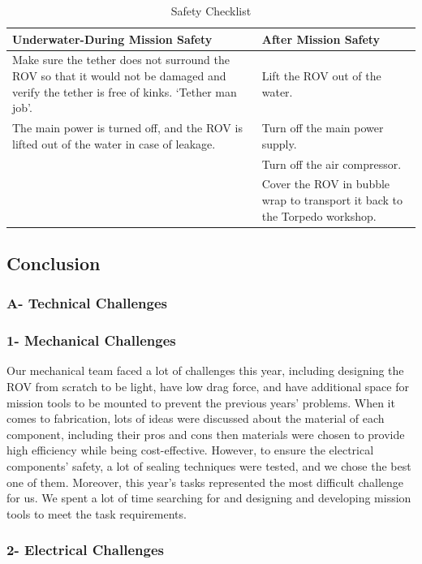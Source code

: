 \documentclass[a4paper,12pt,leqno]{report}
\begin{document}
\begin{table}[H]
	\centering
	\caption{Safety Checklist}
	\begin{tabular}{|p{8cm}|p{8cm}|}
	\hline
\textcolor{red!80}{Underwater-During Mission Safety}&\textcolor{red!80}{After Mission Safety}\\ \hline
Make sure the tether does not  surround the ROV so that it would not be damaged and verify the tether  is free of kinks. ‘Tether man job’. &Lift the ROV out of the water. \\ \hline
The main power is turned off, and the ROV is lifted out of the water in case of leakage. & Turn off the main power supply. \\ \hline
& Turn off the air compressor. \\ \hline
&Cover the ROV in bubble wrap to transport it back to the Torpedo workshop. \\ \hline
	\end{tabular}
\end{table}
\textcolor{blue!90}{
	\section{Conclusion}}
\textcolor{blue!40}{
	\subsubsection{A- Technical Challenges}}
\textcolor{orange!90}{
\subsubsection{1- Mechanical Challenges}}
Our mechanical team faced a lot of challenges this year, including designing the ROV from  scratch to be light, have low drag force, and have additional space for mission tools to be mounted to prevent the previous years’ problems. When it comes to fabrication, lots of ideas  were discussed about the material of each component, including their pros and cons then  materials were chosen to provide high efficiency while being cost-effective. However, to ensure  the electrical components' safety, a lot of sealing techniques were tested, and we chose the best  one of them. Moreover, this year’s tasks represented the most difficult challenge for us. We  spent a lot of time searching for and designing and developing mission tools to meet the task  requirements.\\ 
\textcolor{orange!90}{
	\subsubsection{2- Electrical Challenges}}
\end{document}
